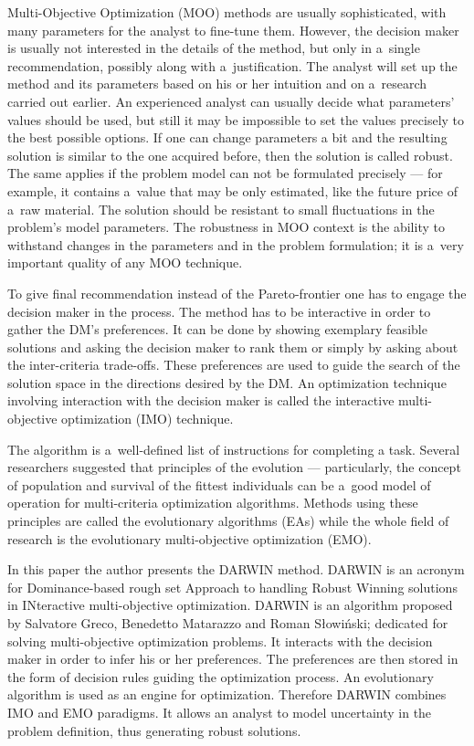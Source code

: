 Multi-Objective Optimization (MOO) methods are usually sophisticated, with
many parameters for the analyst to fine-tune them. However, the decision maker
is usually not interested in the details of the method, but only in a~single
recommendation, possibly along with a~justification. The analyst will set up
the method and its parameters based on his or her intuition and on a~research
carried out earlier. An experienced analyst can usually decide what
parameters' values should be used, but still it may be impossible to set the
values precisely to the best possible options. If one can change parameters a
bit and the resulting solution is similar to the one acquired before, then the
solution is called robust. The same applies if the problem model can not be
formulated precisely --- for example, it contains a~value that may be only
estimated, like the future price of a~raw material. The solution should be
resistant to small fluctuations in the problem's model parameters. The
robustness in MOO context is the ability to withstand changes in the
parameters and in the problem formulation; it is a~very important quality of
any MOO technique.

To give final recommendation instead of the Pareto-frontier one has to engage
the decision maker in the process. The method has to be interactive in order
to gather the DM's preferences. It can be done by showing exemplary feasible
solutions and asking the decision maker to rank them or simply by asking about
the inter-criteria trade-offs. These preferences are used to guide the search
of the solution space in the directions desired by the DM. An optimization
technique involving interaction with the decision maker is called the
interactive multi-objective optimization (IMO) technique.

The algorithm is a~well-defined list of instructions for completing a
task. Several researchers suggested that principles of the evolution ---
particularly, the concept of population and survival of the fittest
individuals can be a~good model of operation for multi-criteria optimization
algorithms. Methods using these principles are called the evolutionary
algorithms (EAs) while the whole field of research is the evolutionary
multi-objective optimization (EMO).

In this paper the author presents the DARWIN method. DARWIN is an acronym for
Dominance-based rough set Approach to handling Robust Winning solutions in
INteractive multi-objective optimization. DARWIN is an algorithm proposed by
Salvatore Greco, Benedetto Matarazzo and Roman Słowiński; dedicated for
solving multi-objective optimization problems. It interacts with the decision
maker in order to infer his or her preferences. The preferences are then
stored in the form of decision rules guiding the optimization process. An
evolutionary algorithm is used as an engine for optimization. Therefore DARWIN
combines IMO and EMO paradigms. It allows an analyst to model uncertainty in
the problem definition, thus generating robust solutions.

